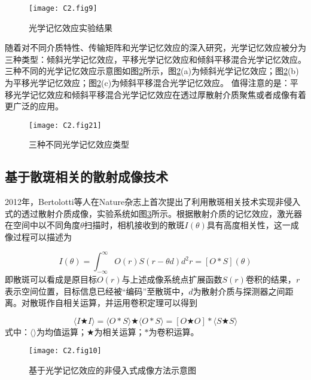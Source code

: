 \begin{figure}[htp]
	\centering
	\texttt{[image: C2.fig9]}
	\caption{光学记忆效应实验结果\cite{Freund1988}}
	\label{fig2:9}
\end{figure}

随着对不同介质特性、传输矩阵和光学记忆效应的深入研究，光学记忆效应被分为三种类型：倾斜光学记忆效应，平移光学记忆效应和倾斜平移混合光学记忆效应\cite{osnabrugge_generalized_2017}。三种不同的光学记忆效应示意图如图\ref{fig2:21}所示，图\ref{fig2:21}(a)为倾斜光学记忆效应\cite{Freund1988}；图\ref{fig2:21}(b)为平移光学记忆效应\cite{judkewitz_translation_2015}；图\ref{fig2:21}(c)为倾斜平移混合光学记忆效应\cite{osnabrugge_generalized_2017}。
值得注意的是：平移光学记忆效应和倾斜平移混合光学记忆效应在透过厚散射介质聚焦或者成像有着更广泛的应用。

\begin{figure}[htp]
	\centering
	\texttt{[image: C2.fig21]}
	\caption{三种不同光学记忆效应类型}
	\label{fig2:21}
\end{figure}

\subsection{基于散斑相关的散射成像技术}

2012年，Bertolotti等人\cite{bertolotti_non-invasive_2012}在Nature杂志上首次提出了利用散斑相关技术实现非侵入式的透过散射介质成像，实验系统如图\ref{fig2:10}所示。根据散射介质的记忆效应，激光器在空间中以不同角度$\theta$扫描时，相机接收到的散斑$I(\theta)$具有高度相关性，这一成像过程可以描述为

\begin{equation}
  I(\theta)= \int_{-\infty}^{\infty} O(r)S(r-\theta d) d^2 r = [O*S](\theta)
\label{eq:2.4}
\end{equation}
即散斑可以看成是原目标$O(r)$与上述成像系统点扩展函数$S(r)$卷积的结果，$r$表示空间位置，目标信息已经被“编码”至散斑中，$d$为散射介质与探测器之间距离。对散斑作自相关运算，并运用卷积定理可以得到

\begin{equation}
  \langle I\bigstar I \rangle = \langle O*S \rangle \bigstar \langle O*S \rangle = [O \bigstar O] * \langle S\bigstar S \rangle
\label{eq:2.5}
\end{equation}
式中：$\langle \rangle$为均值运算；$\bigstar$为相关运算；$*$为卷积运算。

\begin{figure}[htp]
	\centering
	\texttt{[image: C2.fig10]}
	\caption{基于光学记忆效应的非侵入式成像方法示意图\cite{bertolotti_non-invasive_2012}}
	\label{fig2:10}
\end{figure}

